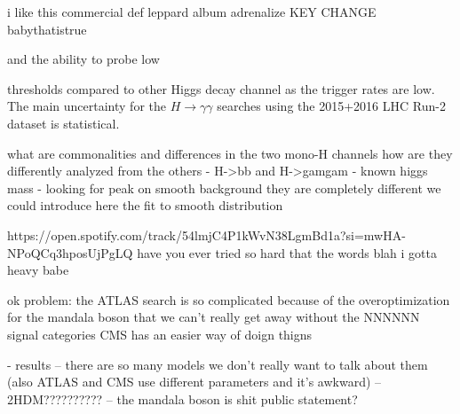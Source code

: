


i like this commercial def leppard album
adrenalize
KEY CHANGE
babythatistrue



and the ability to probe low \MET 



thresholds compared to other Higgs decay channel as the trigger rates are low. 
The main uncertainty for the $H \rightarrow \gamma\gamma$ searches using the 2015+2016
LHC Run-2 dataset is statistical. 



what are commonalities and differences in the two mono-H channels
how are they differently analyzed from the others
- H->bb and H->gamgam
- known higgs mass
- looking for peak on smooth background
they are completely different 
we could introduce here the fit to smooth distribution

https://open.spotify.com/track/54lmjC4P1kWvN38LgmBd1a?si=mwHA-NPoQCq3hposUjPgLQ
have you ever tried so hard that the words blah
i gotta heavy babe



ok problem: the ATLAS search is so complicated because of the overoptimization for the mandala boson that we can't really get away without the NNNNNN signal categories 
CMS has an easier way of doign thigns


- results 
-- there are so many models we don't really want to talk about them (also ATLAS and CMS use different parameters and it's awkward)
-- 2HDM??????????
-- the mandala boson is shit public statement?








